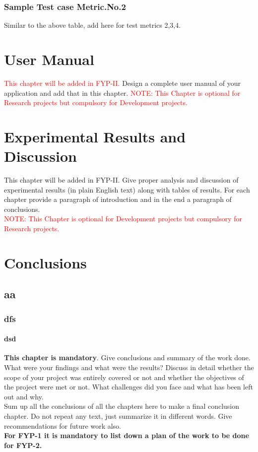 \documentclass{FastFyp}
\begin{document}
\subsection{Sample Test case Metric.No.2}
Similar to the above table, add here for test metrics 2,3,4.\\
\chapter{User Manual}
\textcolor{red}{This chapter will be added in FYP-II.} Design a complete user manual of your application and add that in this chapter.
\textcolor{red}{NOTE: This Chapter is optional for Research projects but compulsory for Development projects.}\\


\chapter{Experimental Results and Discussion}
This chapter will be added in FYP-II. Give proper analysis and discussion of experimental results (in plain English text) along with tables of results.  For each chapter provide a paragraph of introduction and in the end a paragraph of conclusions.\\
\textcolor{red}{NOTE: This Chapter is optional for Development projects but compulsory for Research projects.}



\chapter{Conclusions}
\section{aa}
\subsection{dfs}
\subsubsection{dsd}
{\bf This chapter is mandatory}.  
Give conclusions and summary of the work done.  What were your findings and what were the results?  Discuss in detail whether the scope of your project was entirely covered or not and whether the objectives of the project were met or not.  What challenges did you face and what has been left out and why.\\
Sum up all the conclusions of all the chapters here to make a final conclusion chapter.  Do not repeat any text, just summarize it in different words. Give recommendations for future work also.\\
\textbf{For FYP-1 it is mandatory to list down a plan of the work to be done for FYP-2.}
\end{document}
